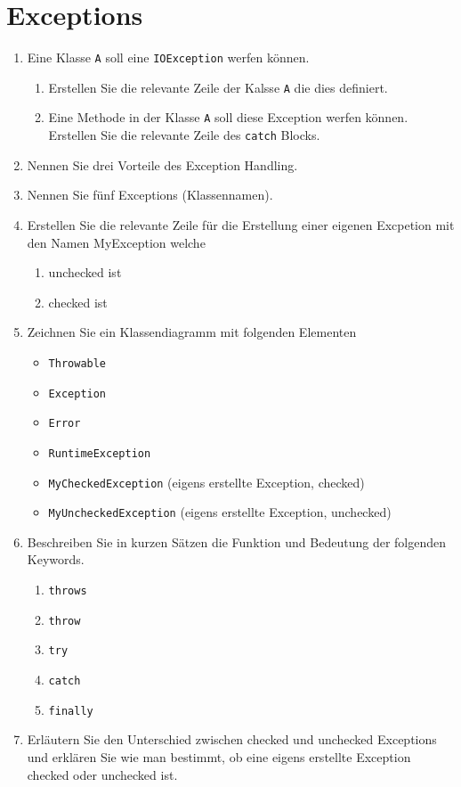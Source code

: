 \newpage
\section{Exceptions}

\begin{enumerate}
    \item Eine Klasse \verb?A? soll eine \verb?IOException? werfen können. 
        \begin{enumerate}[label=(\alph*)]
            \item Erstellen Sie die relevante Zeile der Kalsse \verb?A? die
                dies definiert.
            \item Eine Methode in der Klasse \verb?A? soll diese Exception
                werfen können. Erstellen Sie die relevante Zeile des 
                \verb?catch? Blocks.
        \end{enumerate}
    \item Nennen Sie drei Vorteile des Exception Handling.
    \item Nennen Sie fünf Exceptions (Klassennamen).
    \item Erstellen Sie die relevante Zeile für die Erstellung einer eigenen
        Excpetion mit den Namen MyException welche
        \begin{enumerate}[label=(\alph*)]
            \item unchecked ist
            \item checked ist
        \end{enumerate}
    \item Zeichnen Sie ein Klassendiagramm mit folgenden Elementen
        \begin{itemize}
            \item \verb?Throwable?
            \item \verb?Exception?
            \item \verb?Error?
            \item \verb?RuntimeException?
            \item \verb?MyCheckedException? (eigens erstellte Exception, checked)
            \item \verb?MyUncheckedException? (eigens erstellte Exception, unchecked)
        \end{itemize}
    \item Beschreiben Sie in kurzen Sätzen die Funktion und Bedeutung
        der folgenden Keywords.
        \begin{enumerate}[label=(\alph*)]
            \item \verb?throws?
            \item \verb?throw?
            \item \verb?try?
            \item \verb?catch?
            \item \verb?finally?
        \end{enumerate}
    \item Erläutern Sie den Unterschied zwischen checked und unchecked 
        Exceptions und erklären Sie wie man bestimmt, ob eine eigens
        erstellte Exception checked oder unchecked ist.
\end{enumerate}
